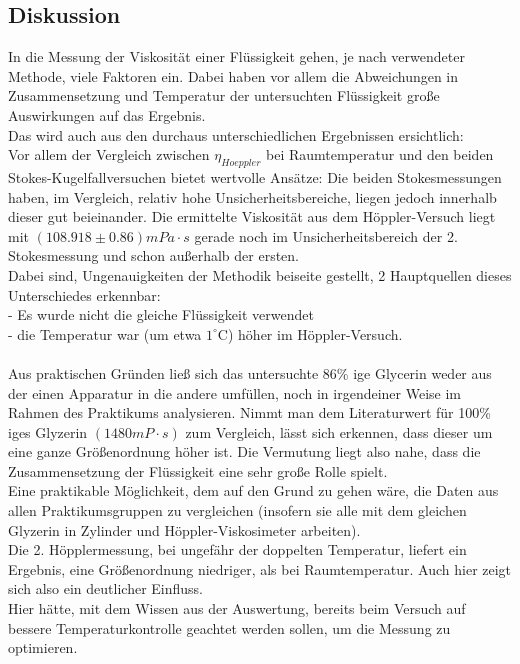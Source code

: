 \documentclass[12pt,a4paper]{article}
\begin{document}
\begin{multicols}{2}
\subsection{Diskussion}
In die Messung der Viskosität einer Flüssigkeit gehen, je nach verwendeter Methode, viele Faktoren ein. Dabei haben vor allem die Abweichungen in Zusammensetzung und Temperatur der untersuchten Flüssigkeit große Auswirkungen auf das Ergebnis.\\
Das wird auch aus den durchaus unterschiedlichen Ergebnissen ersichtlich:\\
Vor allem der Vergleich zwischen $\eta_{Hoeppler}$ bei Raumtemperatur und den beiden Stokes-Kugelfallversuchen bietet wertvolle Ansätze: Die beiden Stokesmessungen haben, im Vergleich, relativ hohe Unsicherheitsbereiche, liegen jedoch innerhalb dieser gut beieinander. Die ermittelte Viskosität aus dem Höppler-Versuch liegt mit $(108.918\pm 0.86)mPa\cdot s$ gerade noch im Unsicherheitsbereich der 2. Stokesmessung und schon außerhalb der ersten.\\
Dabei sind, Ungenauigkeiten der Methodik beiseite gestellt, 2 Hauptquellen dieses Unterschiedes erkennbar:\\
- Es wurde nicht die gleiche Flüssigkeit verwendet\\
- die Temperatur war (um etwa $1^\circ$C) höher im Höppler-Versuch.\\
\\
Aus praktischen Gründen ließ sich das untersuchte 86\% ige Glycerin weder aus der einen Apparatur in die andere umfüllen, noch in irgendeiner Weise im Rahmen des Praktikums analysieren. Nimmt man dem Literaturwert für 100\% iges Glyzerin $(1480 mP \cdot s)$ zum Vergleich, lässt sich erkennen, dass dieser um eine ganze Größenordnung höher ist. Die Vermutung liegt also nahe, dass die Zusammensetzung der Flüssigkeit eine sehr große Rolle spielt.\\
Eine praktikable Möglichkeit, dem auf den Grund zu gehen wäre, die Daten aus allen Praktikumsgruppen zu vergleichen (insofern sie alle mit dem gleichen Glyzerin in Zylinder und Höppler-Viskosimeter arbeiten).\\
Die 2. Höpplermessung, bei ungefähr der doppelten Temperatur, liefert ein Ergebnis, eine Größenordnung niedriger, als bei Raumtemperatur. Auch hier zeigt sich also ein deutlicher Einfluss.\\
Hier hätte, mit dem Wissen aus der Auswertung, bereits beim Versuch auf bessere Temperaturkontrolle geachtet werden sollen, um die Messung zu optimieren.\\

\end{multicols}
\end{document}
